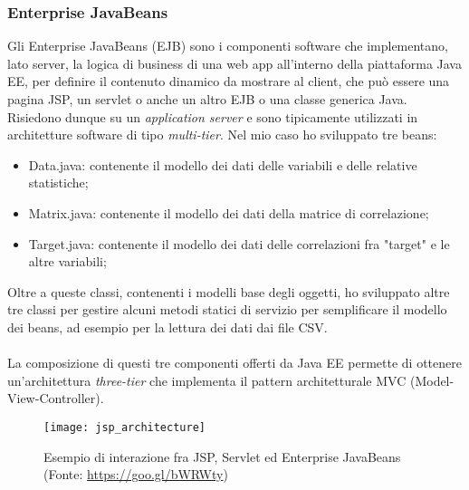 \subsubsection{Enterprise JavaBeans}
Gli Enterprise JavaBeans (EJB) sono i componenti software che implementano, lato server, la logica di business di una \gls{web app} all'interno della piattaforma Java EE, per definire il contenuto dinamico da mostrare al client, che può essere una pagina JSP, un servlet o anche un altro EJB o una classe generica Java. Risiedono dunque su un \textit{application server} e sono tipicamente utilizzati in architetture software di tipo \textit{multi-tier}.
Nel mio caso ho sviluppato tre beans:
\begin{itemize}
	\item Data.java: contenente il modello dei dati delle variabili e delle relative statistiche;
	\item Matrix.java: contenente il modello dei dati della matrice di correlazione;
	\item Target.java: contenente il modello dei dati delle correlazioni fra "target" e le altre variabili;
\end{itemize}

Oltre a queste classi, contenenti i modelli base degli oggetti, ho sviluppato altre tre classi per gestire alcuni metodi statici di servizio per semplificare il modello dei beans, ad esempio per la lettura dei dati dai file \gls{CSV}.\\\\
La composizione di questi tre componenti offerti da Java EE permette di ottenere un'architettura \textit{three-tier} che implementa il pattern architetturale MVC (Model-View-Controller).
\begin{figure}[!h]
	\centering
	\texttt{[image: jsp\_architecture]}
	\caption{Esempio di interazione fra JSP, Servlet ed Enterprise JavaBeans (Fonte: \href{https://goo.gl/bWRWty}{https://goo.gl/bWRWty})}
\end{figure}

